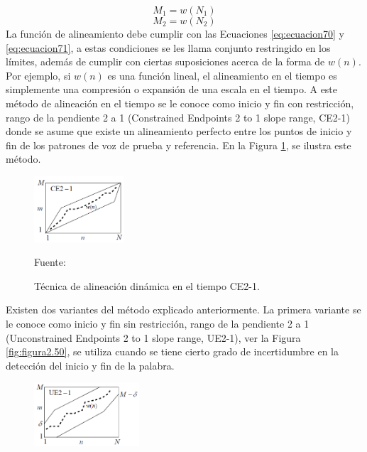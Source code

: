 \begin{enumerate}
\newpage
\begin{equation}
\label{eq:ecuacion70}
M_{1} = w(N_{1})
\end{equation}
\begin{equation}
\label{eq:ecuacion71}
M_{2} = w(N_{2})
\end{equation}
La función de alineamiento debe cumplir con las Ecuaciones \eqref{eq:ecuacion70} y \eqref{eq:ecuacion71}, a estas condiciones se les llama conjunto restringido en los límites, además de cumplir con ciertas suposiciones acerca de la forma de $w(n)$. Por ejemplo, si $w(n)$ es una función lineal, el alineamiento en el tiempo es simplemente una compresión o expansión de una escala en el tiempo. A este método de alineación en el tiempo se le conoce como inicio y fin con restricción, rango de la pendiente 2 a 1 (Constrained Endpoints 2 to 1 slope range, CE2-1) donde se asume que existe un alineamiento perfecto entre los puntos de inicio y fin de los patrones de voz de prueba y referencia. En la Figura \ref{fig:figura2.49}, se ilustra este método.
\begin{figure}[H]
\begin{center}
\includegraphics[width=0.3\textwidth]{Imagenes/Cap2/image050}
\end{center}
\begin{center}
\vskip -0.5cm
\caption{\small{Técnica de alineación dinámica en el tiempo CE2-1.}}
\label{fig:figura2.49}
{\small{Fuente: \cite{rabiner}}}
\end{center}
\end{figure}
\vskip -0.5cm
Existen dos variantes del método explicado anteriormente. La primera variante se le conoce como inicio y fin sin restricción, rango de la pendiente 2 a 1 (Unconstrained Endpoints 2 to 1 slope range, UE2-1), ver la Figura \ref{fig:figura2.50}, se utiliza cuando se tiene cierto grado de incertidumbre en la detección del inicio y fin de la palabra. 
\vskip 0.2cm
\begin{figure}[H]
\begin{center}
\includegraphics[width=0.35\textwidth]{Imagenes/Cap2/image051}

\end{center}
\end{figure}
\end{enumerate}
